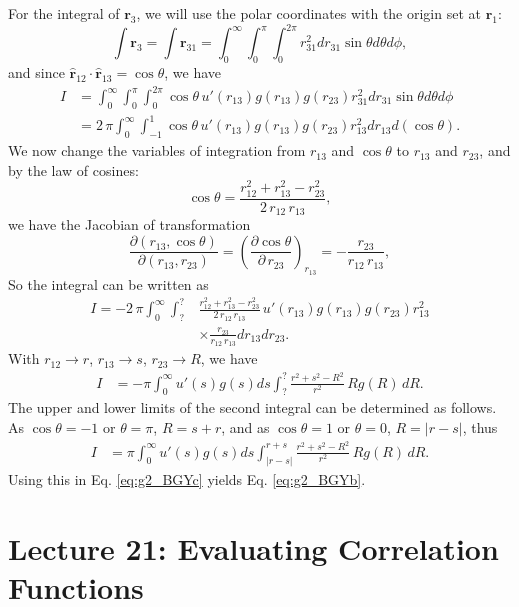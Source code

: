 \documentclass[twocolumn, 10pt]{article}
\numberwithin{equation}{section}
\newenvironment{solution}[1][\empty]
{\par\medskip\sffamily
  \textbf{\ifx\empty#1{Solution.}\relax\else{#1}\fi} \ignorespaces}
{\medskip}
\begin{document}
\begin{solution}
For the integral of $\mathbf r_3$,
we will use the polar coordinates
with the origin set at $\mathbf r_1$:
$$
\int \mathbf r_3 = \int \mathbf r_{31}
=
\int_0^\infty \int_0^\pi \int_0^{2\pi} r_{31}^2 dr_{31} \sin\theta d\theta d\phi,
$$
and since
$\hat{\mathbf r}_{12} \cdot \hat{ \mathbf r}_{13}=\cos\theta$,
we have
\begin{align*}
  I &=
  \int_0^\infty \int_0^\pi \int_0^{2\pi}
  \cos\theta \,
  u'(r_{13}) g(r_{13}) g(r_{23})
  r_{31}^2 dr_{31}
  \sin\theta d\theta d\phi
  \\
  &=
  2 \, \pi \int_0^\infty \int_{-1}^{1}
  \cos\theta \,
  u'(r_{13}) g(r_{13}) g(r_{23})
  r_{13}^2 dr_{13}
  d(\cos\theta).
\end{align*}
%
We now change the variables of integration
from $r_{13}$ and $\cos\theta$ to $r_{13}$ and $r_{23}$,
and by the law of cosines:
$$
\cos\theta
=
\frac{ r_{12}^2 + r_{13}^2 - r_{23}^2 }
{ 2 \, r_{12} \, r_{13} },
$$
we have the Jacobian of transformation
$$
\frac{ \partial( r_{13}, \cos\theta ) }
{ \partial( r_{13}, r_{23} ) }
=
\left( \frac{ \partial \cos\theta } { \partial \, r_{23} } \right)_{r_{13}}
=
-\frac{r_{23}}{r_{12} \, r_{13}},
$$
So the integral can be written as
\begin{align*}
  I
  =
  -2 \, \pi \int_0^\infty \int_{?}^{?} &
\frac{ r_{12}^2 + r_{13}^2 - r_{23}^2 }
{ 2 \, r_{12} \, r_{13} } \,
  u'(r_{13}) g(r_{13}) g(r_{23})
  r_{13}^2
  \\
  &
  \times \frac{r_{23} }{r_{12} \, r_{13} }
  d r_{13}
  d r_{23}
  .
\end{align*}
%
With $r_{12} \to r$, $r_{13} \to s$, $r_{23} \to R$,
we have
\begin{align*}
  I&=
  -\pi \int_0^\infty
  u'(s) g(s)
  d s
  \int_{?}^{?}
\frac{ r^2 + s^2 - R^2 }
{ r^2 } \,
  R g(R) \, d R
  .
\end{align*}
The upper and lower limits of the second integral
can be determined as follows.
As $\cos\theta = -1$ or $\theta = \pi$, $R = s + r$,
and as $\cos\theta = 1$ or $\theta = 0$, $R = |r - s|$,
thus
\begin{align*}
  I&=
  \pi \int_0^\infty
  u'(s) g(s)
  d s
  \int_{|r-s|}^{r+s}
\frac{ r^2 + s^2 - R^2 }
{ r^2 } \,
  R g(R) \, d R
  .
\end{align*}
Using this in Eq. \eqref{eq:g2_BGYc} yields Eq. \eqref{eq:g2_BGYb}.
%
\end{solution}


\section{Lecture 21: Evaluating Correlation Functions}
\end{document}
